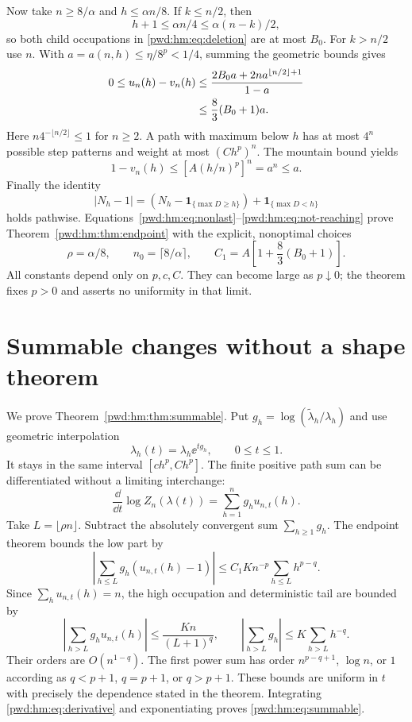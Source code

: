 \documentclass[11pt,letterpaper]{article}
\numberwithin{equation}{section}
\theoremstyle{remark}\newtheorem{remark}[theorem]{Remark}
\begin{document}
Now take $n\ge8/\alpha$ and $h\le\alpha n/8$. If $k\le n/2$, then
\[
 h+1\le\alpha n/4\le\alpha(n-k)/2,
\]
so both child occupations in \eqref{pwd:hm:eq:deletion} are at most $B_0$. For $k>n/2$ use $n$. With $a=a(n,h)\le\eta/8^p<1/4$, summing the geometric bounds gives
\begin{align}\label{pwd:hm:eq:nonlast}
 0\le u_n(h)-v_n(h)
 &\le\frac{2B_0a+2n a^{\lfloor n/2\rfloor+1}}{1-a}\notag\\
 &\le\frac83(B_0+1)a.
\end{align}
Here $n4^{-\lfloor n/2\rfloor}\le1$ for $n\ge2$. A path with maximum below $h$ has at most $4^n$ possible step patterns and weight at most $(Ch^p)^n$. The mountain bound yields
\begin{equation}\label{pwd:hm:eq:not-reaching}
 1-v_n(h)\le[A(h/n)^p]^n=a^n\le a.
\end{equation}
Finally the identity
\[
 |N_h-1|=(N_h-\mathbf1_{\{\max D\ge h\}})+\mathbf1_{\{\max D<h\}}
\]
holds pathwise. Equations~\eqref{pwd:hm:eq:nonlast}--\eqref{pwd:hm:eq:not-reaching} prove Theorem~\ref{pwd:hm:thm:endpoint} with the explicit, nonoptimal choices
\begin{equation}\label{pwd:hm:eq:rho}
 \rho=\alpha/8,\qquad n_0=\lceil8/\alpha\rceil,\qquad
 C_1=A\left[1+\frac83(B_0+1)\right].
\end{equation}
All constants depend only on $p,c,C$. They can become large as $p\downarrow0$; the theorem fixes $p>0$ and asserts no uniformity in that limit.

\section{Summable changes without a shape theorem}\label{pwd:hm:sec:stability}
We prove Theorem~\ref{pwd:hm:thm:summable}. Put $g_h=\log(\widetilde\lambda_h/\lambda_h)$ and use geometric interpolation
\[
 \lambda_h(t)=\lambda_h\ee^{tg_h},\qquad 0\le t\le1.
\]
It stays in the same interval $[ch^p,Ch^p]$. The finite positive path sum can be differentiated without a limiting interchange:
\begin{equation}\label{pwd:hm:eq:derivative}
 \frac{\dd}{\dd t}\log Z_n(\lambda(t))
 =\sum_{h=1}^ng_hu_{n,t}(h).
\end{equation}
Take $L=\lfloor\rho n\rfloor$. Subtract the absolutely convergent sum $\sum_{h\ge1}g_h$. The endpoint theorem bounds the low part by
\[
 \left|\sum_{h\le L}g_h(u_{n,t}(h)-1)\right|
 \le C_1K n^{-p}\sum_{h\le L}h^{p-q}.
\]
Since $\sum_hu_{n,t}(h)=n$, the high occupation and deterministic tail are bounded by
\[
 \left|\sum_{h>L}g_hu_{n,t}(h)\right|\le\frac{Kn}{(L+1)^q},
 \qquad \left|\sum_{h>L}g_h\right|\le K\sum_{h>L}h^{-q}.
\]
Their orders are $O(n^{1-q})$. The first power sum has order $n^{p-q+1}$, $\log n$, or $1$ according as $q<p+1$, $q=p+1$, or $q>p+1$. These bounds are uniform in $t$ with precisely the dependence stated in the theorem. Integrating \eqref{pwd:hm:eq:derivative} and exponentiating proves \eqref{pwd:hm:eq:summable}.
\end{document}
